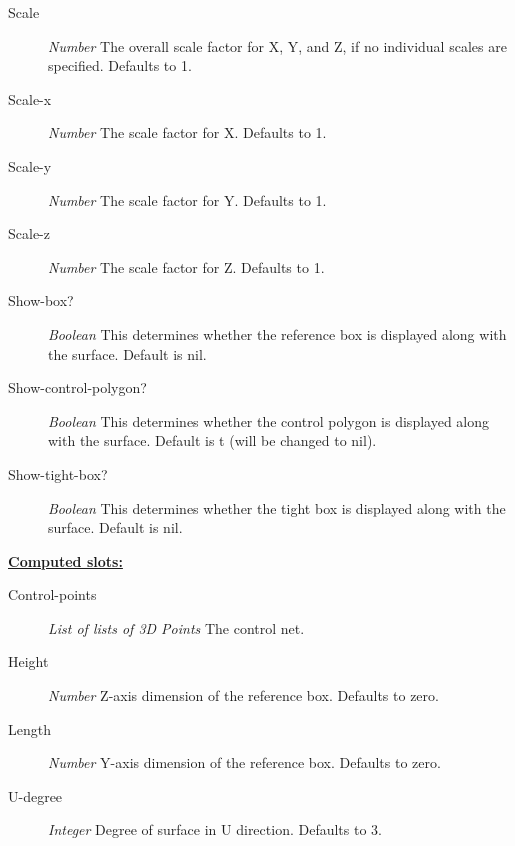 \documentclass [11pt]{book}
\begin{document}
\begin{itemize}
\begin{description}
\item [Scale]
\emph{Number} The overall scale factor for X, Y, and Z, if no individual scales are specified. Defaults to 1.


\item [Scale-x]
\emph{Number} The scale factor for X. Defaults to 1.


\item [Scale-y]
\emph{Number} The scale factor for Y. Defaults to 1.


\item [Scale-z]
\emph{Number} The scale factor for Z. Defaults to 1.


\item [Show-box?]
\emph{Boolean} This determines whether the reference box is displayed along with the surface. Default is nil.


\item [Show-control-polygon?]
\emph{Boolean} This determines whether the control polygon is displayed along with the surface. Default is t (will be changed to nil).


\item [Show-tight-box?]
\emph{Boolean} This determines whether the tight box is displayed along with the surface. Default is nil.


\end{description}






\textbf{
\underline{Computed slots:}}

\begin{description}

\item [Control-points]
\emph{List of lists of 3D Points} The control net.


\item [Height]
\emph{Number} Z-axis dimension of the reference box. Defaults to zero.


\item [Length]
\emph{Number} Y-axis dimension of the reference box. Defaults to zero.


\item [U-degree]
\emph{Integer} Degree of surface in U direction. Defaults to 3.



\end{description}
\end{itemize}
\end{document}
